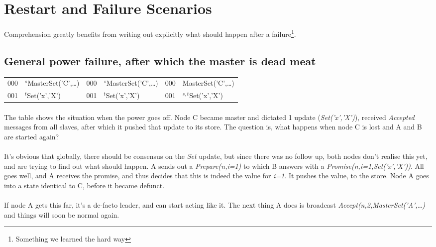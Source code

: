 \section{Restart and Failure Scenarios}
Comprehension greatly benefits from writing out explicitly what should happen after a failure\footnote{Something we learned the hard way}.

\subsection{General power failure, after which the master is dead meat}
\begin{supertabular}{|cl|cl|cl|}
  000 & $^s$MasterSet('C',\ldots) & 000 & $^s$MasterSet('C',\ldots) & 000 & MasterSet('C',\ldots) \\
  001 & $^t$Set('x','X')          & 001 & $^t$Set('x','X')          & 001 & $^{s,t}$Set('x','X')   \\
\hline
\end{supertabular}
\paragraph{}
The table shows the situation when the power goes off. 
Node C became master and dictated 1 update (\emph{Set('x','X')}), received \emph{Accepted} messages from all slaves,
after which it pushed that update to its store. 
The question is, what happens when node C is lost and A and B are started again?

\paragraph{}
It's obvious that globally, there should be consensus on the \emph{Set} update, but since there was no follow up, 
both nodes don't realise this yet, and are trying to find out what should happen.
A sends out a \emph{Prepare(n,i=1)} to which B answers with a \emph{Promise(n,i=1,Set('x','X'))}.
All goes well, and A receives the promise, and thus decides that this is indeed the value for \emph{i=1}.
It pushes the value, to the store. 
Node A goes into a state identical to C, before it became defunct.
\paragraph{}
If node A gets this far, it's a de-facto leader, and can start acting like it. 
The next thing A does is broadcast \emph{Accept(n,2,MasterSet('A',\ldots)} and things will soon be normal again.

